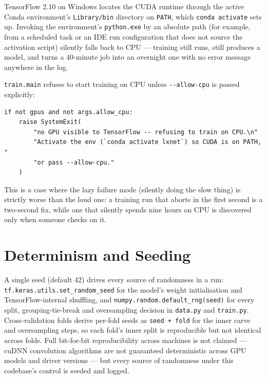 \documentclass[11pt,a4paper,oneside]{report}
\newcommand{\code}[1]{\texttt{\small #1}}
\begin{document}
TensorFlow 2.10 on Windows locates the CUDA runtime through the active
Conda environment's \texttt{Library/bin} directory on \texttt{PATH}, which
\code{conda activate} sets up. Invoking the environment's
\texttt{python.exe} by an absolute path (for example, from a scheduled task
or an IDE run configuration that does not source the activation script)
silently falls back to CPU --- training still runs, still produces a
model, and turns a 40-minute job into an overnight one with no error message
anywhere in the log.

\code{train.main} refuses to start training on CPU unless
\code{-{}-allow-cpu} is passed explicitly:

\begin{lstlisting}[caption={Fail fast rather than discover a CPU fallback the
next morning (\texttt{lxnet/train.py}).}, label=lst:gpuguard]
if not gpus and not args.allow_cpu:
    raise SystemExit(
        "no GPU visible to TensorFlow -- refusing to train on CPU.\n"
        "Activate the env (`conda activate lxnet`) so CUDA is on PATH, "
        "or pass --allow-cpu."
    )
\end{lstlisting}

This is a case where the lazy failure mode (silently doing the slow thing)
is strictly worse than the loud one: a training run that aborts in the first
second is a two-second fix, while one that silently spends nine hours on CPU
is discovered only when someone checks on it.

\section{Determinism and Seeding}

A single seed (default 42) drives every source of randomness in a run:
\code{tf.keras.utils.set\_random\_seed} for the model's weight
initialisation and TensorFlow-internal shuffling, and
\code{numpy.random.default\_rng(seed)} for every split, grouping-tie-break
and oversampling decision in \code{data.py} and \code{train.py}.
Cross-validation folds derive per-fold seeds as \code{seed + fold} for the
inner carve and oversampling steps, so each fold's inner split is
reproducible but not identical across folds. Full bit-for-bit reproducibility
across machines is not claimed --- cuDNN convolution algorithms are not
guaranteed deterministic across GPU models and driver versions --- but every
source of randomness under this codebase's control is seeded and logged.

\end{document}
